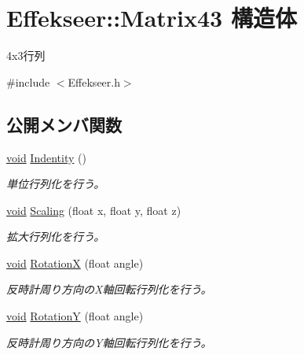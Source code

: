 \hypertarget{struct_effekseer_1_1_matrix43}{}\section{Effekseer\+:\+:Matrix43 構造体}
\label{struct_effekseer_1_1_matrix43}


4x3行列  




{\ttfamily \#include $<$Effekseer.\+h$>$}

\subsection*{公開メンバ関数}
\begin{DoxyCompactItemize}
\item 
\mbox{\hyperlink{namespace_effekseer_ab34c4088e512200cf4c2716f168deb56}{void}} \mbox{\hyperlink{struct_effekseer_1_1_matrix43_a17bf676d8a89baaa9d40637d6a643885}{Indentity}} ()
\begin{DoxyCompactList}\small\item\em 単位行列化を行う。 \end{DoxyCompactList}\item 
\mbox{\hyperlink{namespace_effekseer_ab34c4088e512200cf4c2716f168deb56}{void}} \mbox{\hyperlink{struct_effekseer_1_1_matrix43_a1ace4a644fd8341ab5ebb2370b7f3cc9}{Scaling}} (float x, float y, float z)
\begin{DoxyCompactList}\small\item\em 拡大行列化を行う。 \end{DoxyCompactList}\item 
\mbox{\hyperlink{namespace_effekseer_ab34c4088e512200cf4c2716f168deb56}{void}} \mbox{\hyperlink{struct_effekseer_1_1_matrix43_a8bedcc8419aaf6587f9cfcc958b9afe4}{RotationX}} (float angle)
\begin{DoxyCompactList}\small\item\em 反時計周り方向の\+X軸回転行列化を行う。 \end{DoxyCompactList}\item 
\mbox{\hyperlink{namespace_effekseer_ab34c4088e512200cf4c2716f168deb56}{void}} \mbox{\hyperlink{struct_effekseer_1_1_matrix43_a86c2ba3a6c47c479266218e06da905a8}{RotationY}} (float angle)
\begin{DoxyCompactList}\small\item\em 反時計周り方向の\+Y軸回転行列化を行う。 \end{DoxyCompactList}\item 

\end{DoxyCompactItemize}
